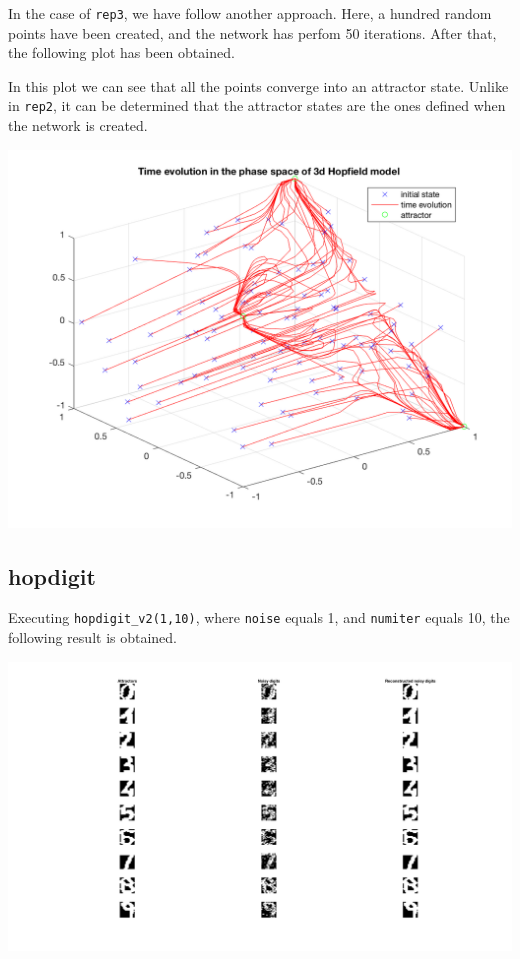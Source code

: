 \documentclass[10pt]{article}
\begin{document}
\begin{multicols}{2}
In the case of \texttt{rep3}, we have follow another approach. Here, a hundred random points have been created,
and the network has perfom 50 iterations. After that, the following plot has been obtained.

In this plot we can see that all the points converge into an attractor state.
Unlike in \texttt{rep2}, it can be determined that the attractor states are the ones defined when the network is created.

\begin{center}
	\includegraphics[width=0.8\linewidth]{img/rep3}
\end{center}

\subsection*{hopdigit}

Executing \texttt{hopdigit\_v2(1,10)}, where \texttt{noise} equals 1, and \texttt{numiter} equals 10, the following result is obtained.

\begin{center}
	\includegraphics[width=0.8\linewidth]{img/hop1-10}
\end{center}


\end{multicols}
\end{document}
